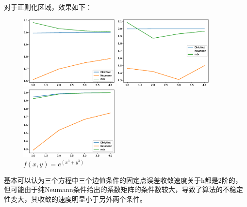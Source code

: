 \documentclass[12]{article}%
\begin{document}
对于正则化区域，效果如下：
\begin{figure}[H]
    \centering
    \begin{minipage}[t]{0.3\textwidth}
    \centering
    \includegraphics[width=5cm]{../pic/fun1_regu_points.eps}
    \caption{$f(x,y)=e^(x^3+y^3)$}
    \end{minipage}
    \begin{minipage}[t]{0.3\textwidth}
    \centering
    \includegraphics[width=5cm]{../pic/fun2_regu_points.eps}
    \caption{$f(x,y)=sin(3x+3y)$}
    \end{minipage}
    \begin{minipage}[t]{0.3\textwidth}
    \centering
    \includegraphics[width=5cm]{../pic/fun3_regu_points.eps}
    \caption{$f(x,y)=e^(x^3+y^3)$}
    \end{minipage}
\end{figure}
基本可以认为三个方程中三个边值条件的固定点误差收敛速度关于h都是2阶的，但可能由于纯Neumann条件给出的系数矩阵的条件数较大，导致了算法的不稳定性变大，其收敛的速度明显小于另外两个条件。
\end{document}
